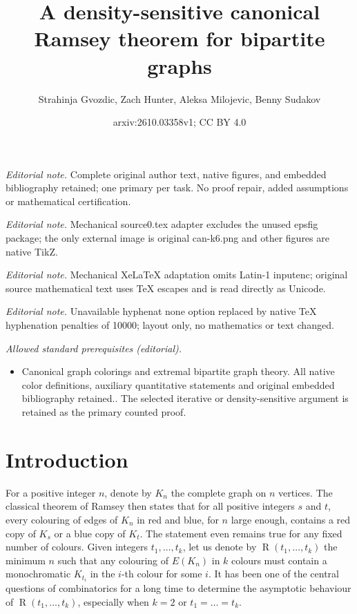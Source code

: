 \documentclass[10pt,a4paper]{article}
\title{A density-sensitive canonical Ramsey theorem for bipartite graphs}
\author{Strahinja Gvozdic, Zach Hunter, Aleksa Milojevic, Benny Sudakov}
\date{arxiv:2610.03358v1; CC BY 4.0}
\theoremstyle{plain}
\theoremstyle{definition}
\begin{document}
\maketitle
\noindent\textit{Editorial note.} Complete original author text, native figures, and embedded bibliography retained; one primary per task. No proof repair, added assumptions or mathematical certification.\par\medskip
\noindent\textit{Editorial note.} Mechanical source0.tex adapter excludes the unused epsfig package; the only external image is original can-k6.png and other figures are native TikZ.\par\medskip
\noindent\textit{Editorial note.} Mechanical XeLaTeX adaptation omits Latin-1 inputenc; original source mathematical text uses TeX escapes and is read directly as Unicode.\par\medskip
\noindent\textit{Editorial note.} Unavailable hyphenat none option replaced by native TeX hyphenation penalties of 10000; layout only, no mathematics or text changed.\par\medskip
\noindent\textit{Allowed standard prerequisites (editorial).}\begin{itemize}
\item Canonical graph colorings and extremal bipartite graph theory. All native color definitions, auxiliary quantitative statements and original embedded bibliography retained.. The selected iterative or density-sensitive argument is retained as the primary counted proof.
\end{itemize}\medskip
\section{Introduction}\label{sec-intro}

For a positive integer $n$, denote by $K_n$ the complete graph on $n$ vertices. The classical theorem of Ramsey then states that for all positive integers $s$ and $t$, every colouring of edges of $K_n$ in red and blue, for $n$ large enough, contains a red copy of $K_s$ or a blue copy of $K_t$. The statement even remains true for any fixed number of colours. Given integers $t_1,\dots,t_k$, let us denote by $\operatorname{R}(t_1,\dots,t_k)$ the minimum $n$ such that any colouring of $E(K_n)$ in $k$ colours must contain a monochromatic $K_{t_i}$ in the $i$-th colour for some $i$. It has been one of the central questions of combinatorics for a long time to determine the asymptotic behaviour of $\operatorname{R}(t_1,\dots,t_k)$, especially when $k=2$ or $t_1=\dots=t_k$.
\end{document}
